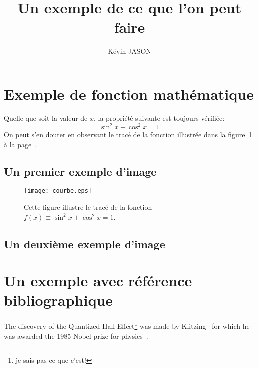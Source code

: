 \documentclass{article}           %
\title{Un exemple de ce que l'on peut faire}     %
\author{Kévin JASON}        %
\begin{document}

\maketitle                        %
\newpage
\tableofcontents                  %
\newpage
\section{Exemple de fonction mathématique}            %
Quelle que soit la valeur de $x$, 
la propriété suivante est toujours 
vérifiée: $$\sin^2 x+\cos^2 x=1$$ 
On peut s'en douter en observant 
le tracé de la fonction illustrée 
dans la figure~\ref{courbe} 
à la page~\pageref{courbe}.
\newpage
\subsection{Un premier exemple d'image}
\begin{figure}[htbp]
\centering
\texttt{[image: courbe.eps]}
\caption{Cette figure illustre 
le tracé de la fonction 
$f(x)\equiv\sin^2 x+\cos^2 x=1$.}
\label{courbe}
\end{figure}
\newpage
\subsection{Un deuxième exemple d'image}
\begin{figure}[htbp]
\centering
{}
\end{figure}

\section{Un exemple avec référence bibliographique}
The discovery of the Quantized Hall Effect\footnote{je sais pas ce que c'est!} was made by
Klitzing~\cite{qhe} for which he was awarded the 1985 Nobel
prize for physics~\cite{nobel}.
\end{document}
